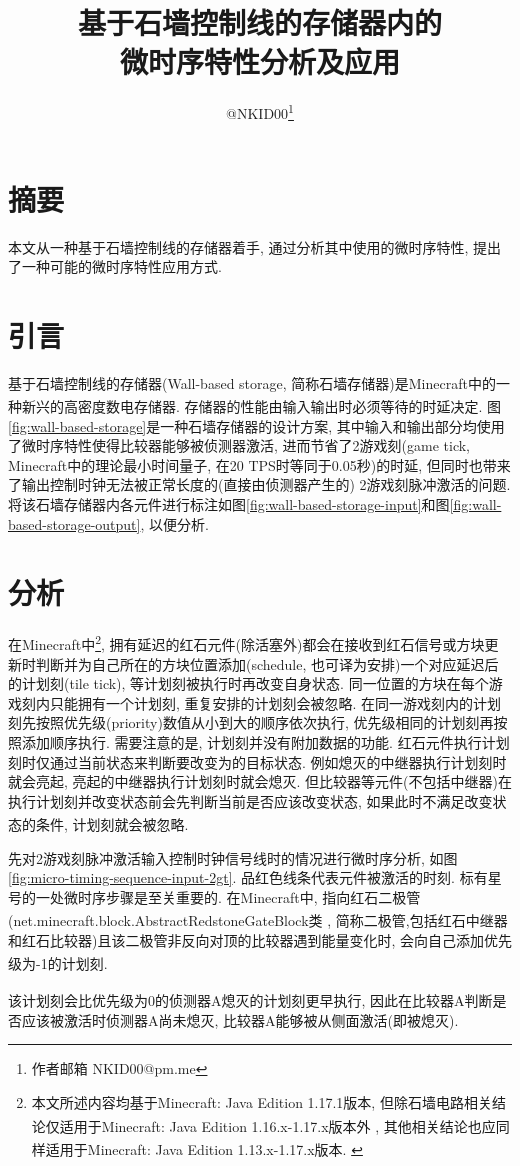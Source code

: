 \documentclass{article}
\title{基于石墙控制线的存储器内的\\微时序特性分析及应用}
\author{@NKID00\footnote{作者邮箱 NKID00@pm.me}}
\date{}
\newcommand*{\upcite}[1]{
    \textsuperscript{\cite{#1}}
}
\begin{document}
    \maketitle

    \section*{摘要}
    本文从一种基于石墙控制线的存储器着手, 通过分析其中使用的微时序特性, 提出了一种可能的微时序特性应用方式.

    \section{引言}
    基于石墙控制线的存储器(Wall-based storage, 简称石墙存储器)是Minecraft中的一种新兴的高密度数电存储器.\upcite{bib:wall-based-storage} 存储器的性能由输入输出时必须等待的时延决定. 图\ref{fig:wall-based-storage}是一种石墙存储器的设计方案, 其中输入和输出部分均使用了微时序特性使得比较器能够被侦测器激活, 进而节省了2游戏刻(game tick, Minecraft中的理论最小时间量子, 在20 TPS时等同于0.05秒)的时延, 但同时也带来了输出控制时钟无法被正常长度的(直接由侦测器产生的) 2游戏刻脉冲激活的问题. 将该石墙存储器内各元件进行标注如图\ref{fig:wall-based-storage-input}和图\ref{fig:wall-based-storage-output}, 以便分析.

    \section{分析}
    在Minecraft中\footnote{本文所述内容均基于Minecraft: Java Edition 1.17.1版本, 但除石墙电路相关结论仅适用于Minecraft: Java Edition 1.16.x-1.17.x版本外\upcite{bib:wall}, 其他相关结论也应同样适用于Minecraft: Java Edition 1.13.x-1.17.x版本.\upcite{bib:tile-tick}}, 拥有延迟的红石元件(除活塞外)都会在接收到红石信号或方块更新时判断并为自己所在的方块位置添加(schedule, 也可译为安排)一个对应延迟后的计划刻(tile tick), 等计划刻被执行时再改变自身状态. 同一位置的方块在每个游戏刻内只能拥有一个计划刻, 重复安排的计划刻会被忽略. 在同一游戏刻内的计划刻先按照优先级(priority)数值从小到大的顺序依次执行, 优先级相同的计划刻再按照添加顺序执行. 需要注意的是, 计划刻并没有附加数据的功能. 红石元件执行计划刻时仅通过当前状态来判断要改变为的目标状态. 例如熄灭的中继器执行计划刻时就会亮起, 亮起的中继器执行计划刻时就会熄灭. 但比较器等元件(不包括中继器)在执行计划刻并改变状态前会先判断当前是否应该改变状态, 如果此时不满足改变状态的条件, 计划刻就会被忽略.\upcite{bib:tile-tick-component}\upcite{bib:yarn}

    先对2游戏刻脉冲激活输入控制时钟信号线时的情况进行微时序分析, 如图\ref{fig:micro-timing-sequence-input-2gt}. 品红色线条代表元件被激活的时刻. 标有星号的一处微时序步骤是至关重要的. 在Minecraft中, 指向红石二极管(net.minecraft.block.AbstractRedstoneGateBlock类\upcite{bib:yarn}, 简称二极管,包括红石中继器和红石比较器)且该二极管非反向对顶的比较器遇到能量变化时, 会向自己添加优先级为-1的计划刻.\upcite{bib:tile-tick-component}\upcite{bib:yarn} 该计划刻会比优先级为0的侦测器A熄灭的计划刻更早执行, 因此在比较器A判断是否应该被激活时侦测器A尚未熄灭, 比较器A能够被从侧面激活(即被熄灭). 
\end{document}
